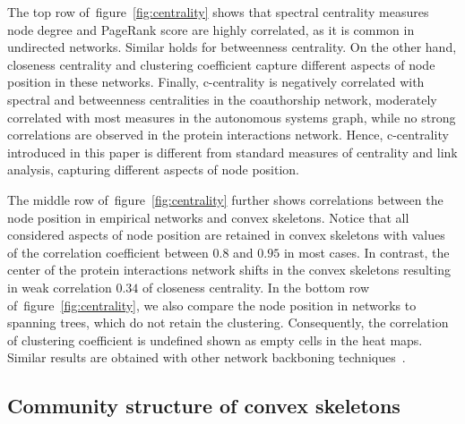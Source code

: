 \documentclass[]{rsif}
\newcommand{\figref}[1]{figure~\ref{fig:#1}\xspace}
\begin{document}
The top row of~\figref{centrality} shows that spectral centrality measures node degree and PageRank score are highly correlated, as it is common in undirected networks. Similar holds for betweenness centrality. On the other hand, closeness centrality and clustering coefficient capture different aspects of node position in these networks. Finally, c-centrality is negatively correlated with spectral and betweenness centralities in the coauthorship network, moderately correlated with most measures in the autonomous systems graph, while no strong correlations are observed in the protein interactions network. Hence, c-centrality introduced in this paper is different from standard measures of centrality and link analysis, capturing different aspects of node position.

The middle row of~\figref{centrality} further shows correlations between the node position in empirical networks and convex skeletons. Notice that all considered aspects of node position are retained in convex skeletons with values of the correlation coefficient between $0.8$ and $0.95$ in most cases. In contrast, the center of the protein interactions network shifts in the convex skeletons resulting in weak correlation $0.34$ of closeness centrality. In the bottom row of~\figref{centrality}, we also compare the node position in networks to spanning trees, which do not retain the clustering. Consequently, the correlation of clustering coefficient is undefined shown as empty cells in the heat maps. Similar results are obtained with other network backboning techniques~\cite{Fre77,GTB12,CN17}.

\subsection{Community structure of convex skeletons}
\end{document}
